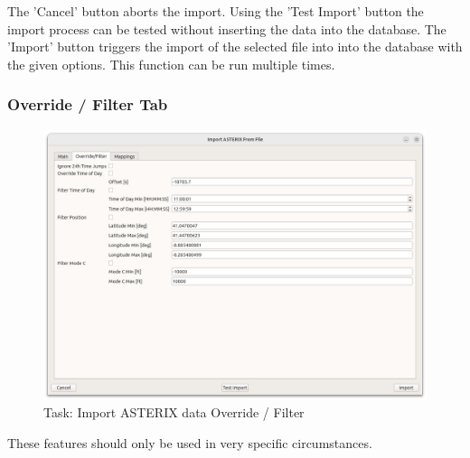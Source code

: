 The 'Cancel' button aborts the import. Using the 'Test Import' button the import process can be tested without inserting the data into the database. 
The 'Import' button triggers the import of the selected file into into the database with the given options. This function can be run multiple times. \\

\subsubsection{Override / Filter Tab}
\label{sec:task_import_asterix_override}

\begin{figure}[H]
  \center
    \hspace*{-0.5cm}
    \includegraphics[width=17cm]{figures/asterix_import_data_override.png}
  \caption{Task: Import ASTERIX data Override / Filter}
\end{figure}

These features should only be used in very specific circumstances.

